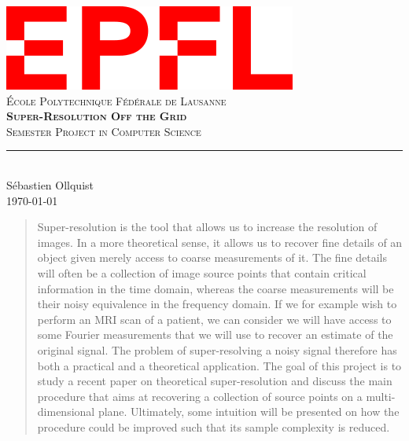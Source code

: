 \documentclass[11pt,titlepage]{report}
\begin{document}
\begin{titlepage}
	\centering
    \includegraphics[width=0.5\linewidth]{images/EPFL.png}\\[0.25cm] 	%
    \textsc{\LARGE École Polytechnique Fédérale de Lausanne}\\ \vspace{\fill}
    \textbf{\textsc{\fontsize{30}{30}\selectfont Super-Resolution Off the Grid}}\\ \vspace{\fill}		
	\textsc{\LARGE Semester Project in Computer Science}\\[0.4cm]
	\rule{\linewidth}{0.2 mm} \\[0.5 cm]
	Sébastien Ollquist \\[2cm] \today
\end{titlepage}
\restoregeometry

\thispagestyle{numberonly}
\begin{abstract}
    Super-resolution is the tool that allows us to increase the resolution of images. In a more theoretical sense, it allows us to recover fine details of an object given merely access to coarse measurements of it. The fine details will often be a collection of image source points that contain critical information in the time domain, whereas the coarse measurements will be their noisy equivalence in the frequency domain. If we for example wish to perform an MRI scan of a patient, we can consider we will have access to some Fourier measurements that we will use to recover an estimate of the original signal. The problem of super-resolving a noisy signal therefore has both a practical and a theoretical application. The goal of this project is to study a recent paper on theoretical super-resolution and discuss the main procedure that aims at recovering a collection of source points on a multi-dimensional plane. Ultimately, some intuition will be presented on how the procedure could be improved such that its sample complexity is reduced.
\end{abstract}
\end{document}
